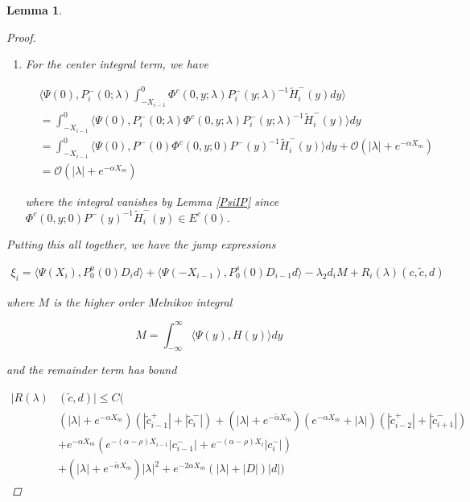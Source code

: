 \documentclass[12pt]{article}
\newtheorem{lemma}{Lemma}
\begin{document}
\begin{lemma}
\begin{proof}
\begin{enumerate}
where we absorbed the $e^{-(\alpha - 2 \rho) X_i}|c_i^-|$ term into the lower order term $|\tilde{c}_i^-|$.

\item For the center integral term, we have

\begin{align*}
&\langle \Psi(0), P_i^-(0; \lambda)
\int_{-X_{i-1}}^0 \Phi^c(0, y; \lambda) P_i^-(y; \lambda)^{-1} \tilde{H}_i^-(y) dy \rangle \\
&= \int_{-X_{i-1}}^0 \langle \Psi(0), P_i^-(0; \lambda) \Phi^c(0, y; \lambda) P_i^-(y; \lambda)^{-1} \tilde{H}_i^-(y) \rangle dy \\
&= \int_{-X_{i-1}}^0 \langle \Psi(0), P^-(0) \Phi^c(0, y; 0) P^-(y)^{-1} \tilde{H}_i^-(y) \rangle dy + \mathcal{O}(|\lambda| + e^{-\alpha X_m}) \\
&= \mathcal{O}(|\lambda| + e^{-\alpha X_m})
\end{align*}

where the integral vanishes by Lemma \ref{PsiIP} since $\Phi^c(0, y; 0) P^-(y)^{-1} \tilde{H}_i^-(y) \in E^c(0)$.

\end{enumerate}

Putting this all together, we have the jump expressions

\begin{align*}
\xi_i = \langle \Psi(X_i), P_0^u(0) D_i d \rangle
+ \langle \Psi(-X_{i-1}), P_0^s(0) D_{i-1} d \rangle 
- \lambda_2 d_i M + R_i(\lambda)(c, \tilde{c}, d)
\end{align*}

where $M$ is the higher order Melnikov integral

\[
M = \int_{-\infty}^\infty \langle \Psi(y), H(y) \rangle dy 
\]

and the remainder term has bound

\begin{align*}
|R(\lambda)&(\tilde{c}, d)| \leq C \Big( \\
&(|\lambda| + e^{-\alpha X_m})(|\tilde{c}_{i-1}^+| + |\tilde{c}_{i}^-|) + (|\lambda| + e^{-\tilde{\alpha} X_m})(e^{-\alpha X_m} + |\lambda|) ( |\tilde{c}_{i-2}^+| + |\tilde{c}_{i+1}^-|)  \\
&+ e^{-\alpha X_m}( e^{-(\alpha - \rho) X_{i-1}} |c_{i-1}^-| + e^{-(\alpha - \rho) X_i} |c_i^-|) \\
&+ (|\lambda| + e^{-\tilde{\alpha} X_m})|\lambda|^2 + e^{-2 \alpha X_m}(|\lambda| + |D|)|d| \Big)
\end{align*}


\end{proof}
\end{lemma}
\end{document}
